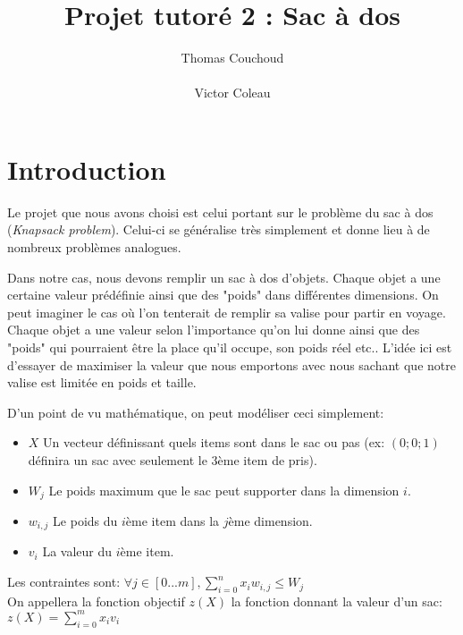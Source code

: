 \documentclass{EPUProjetPeiP}
\title[Projet sac à dos]{Projet tutoré 2 : Sac à dos}
\author{Thomas Couchoud\\
\noindent[\url{thomas.couchoud@etu.univ-tours.fr}]\\
Victor Coleau\\
\noindent[\url{victor.coleau@etu.univ-tours.fr}]}
\begin{document}
\maketitle

\setcounter{page}{0}
{
\setlength{\parskip}{0em}

\tableofcontents


}


\start

\chapter*{Introduction}
Le projet que nous avons choisi est celui portant sur le problème du sac à dos (\textit{Knapsack problem}). Celui-ci se généralise très simplement et donne lieu à de nombreux problèmes analogues.

Dans notre cas, nous devons remplir un sac à dos d'objets. Chaque objet a une certaine valeur prédéfinie ainsi que des "poids" dans différentes dimensions. On peut imaginer le cas où l'on tenterait de remplir sa valise pour partir en voyage. Chaque objet a une valeur selon l'importance qu'on lui donne ainsi que des "poids" qui pourraient être la place qu'il occupe, son poids réel etc.. L'idée ici est d'essayer de maximiser la valeur que nous emportons avec nous sachant que notre valise est limitée en poids et taille.

D'un point de vu mathématique, on peut modéliser ceci simplement:
\begin{itemize}
	\item $X$ Un vecteur définissant quels items sont dans le sac ou pas (ex: $(0; 0; 1)$ définira un sac avec seulement le 3ème item de pris).
	\item $W_j$ Le poids maximum que le sac peut supporter dans la dimension $i$.
	\item $w_{i,j}$ Le poids du $i$ème item dans la $j$ème dimension.
	\item $v_i$ La valeur du $i$ème item.\\
\end{itemize}
Les contraintes sont: $\forall j\in [0...m], \sum_{i=0}^nx_iw_{i,j}\leq W_j$\\
On appellera la fonction objectif $z(X)$ la fonction donnant la valeur d'un sac: $z(X)=\sum_{i=0}^mx_iv_i$
\end{document}
